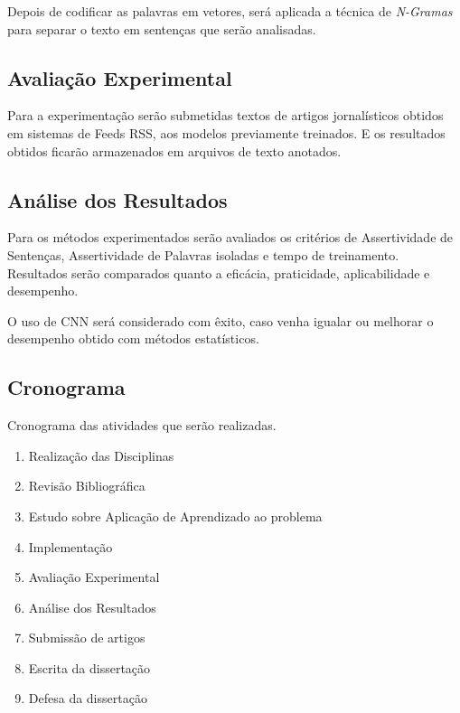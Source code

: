 \documentclass[12pt]{article}
\begin{document}
Depois de codificar as palavras em vetores, será aplicada a técnica de \emph{N-Gramas} para separar o texto em sentenças que serão analisadas.

\subsection{Avaliação Experimental}
Para a experimentação serão submetidas textos de artigos jornalísticos obtidos em sistemas de Feeds RSS, aos modelos previamente treinados. E os resultados obtidos ficarão armazenados em arquivos de texto anotados.

\subsection{Análise dos Resultados}
Para os métodos experimentados serão avaliados os critérios de Assertividade de Sentenças, Assertividade de Palavras isoladas e tempo de treinamento. Resultados serão comparados quanto a eficácia, praticidade, aplicabilidade e desempenho.

O uso de CNN será considerado com êxito, caso  venha igualar ou melhorar o desempenho obtido com métodos estatísticos.

\subsection{Cronograma}

Cronograma das atividades que serão realizadas.

\begin{enumerate}
\item Realização das Disciplinas
\item Revisão  Bibliográfica
\item Estudo sobre Aplicação de Aprendizado ao problema
\item Implementação
\item Avaliação Experimental
\item Análise dos Resultados
\item Submissão de artigos
\item Escrita da dissertação
\item Defesa da dissertação
\end{enumerate}

\begin{gantt}{6}{12}
    \begin{ganttitle}
    \end{ganttitle}
    \begin{ganttitle}
    \end{ganttitle}
\end{gantt}
\end{document}
